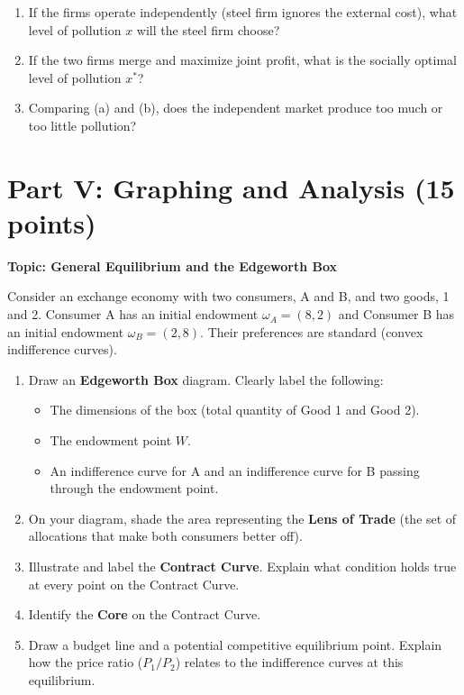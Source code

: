 \documentclass[12pt]{article}
\begin{document}
\begin{enumerate}
    \item[(a)] If the firms operate independently (steel firm ignores the external cost), what level of pollution $x$ will the steel firm choose?
    \item[(b)] If the two firms merge and maximize joint profit, what is the socially optimal level of pollution $x^*$?
    \item[(c)] Comparing (a) and (b), does the independent market produce too much or too little pollution?
\end{enumerate}

\section*{Part V: Graphing and Analysis (15 points)}

\textbf{Topic: General Equilibrium and the Edgeworth Box}

Consider an exchange economy with two consumers, A and B, and two goods, 1 and 2.
Consumer A has an initial endowment $\omega_A = (8, 2)$ and Consumer B has an initial endowment $\omega_B = (2, 8)$.
Their preferences are standard (convex indifference curves).

\begin{enumerate}
    \item[(a)] Draw an \textbf{Edgeworth Box} diagram. Clearly label the following:
    \begin{itemize}
        \item The dimensions of the box (total quantity of Good 1 and Good 2).
        \item The endowment point $W$.
        \item An indifference curve for A and an indifference curve for B passing through the endowment point.
    \end{itemize}
    \item[(b)] On your diagram, shade the area representing the \textbf{Lens of Trade} (the set of allocations that make both consumers better off).
    \item[(c)] Illustrate and label the \textbf{Contract Curve}. Explain what condition holds true at every point on the Contract Curve.
    \item[(d)] Identify the \textbf{Core} on the Contract Curve.
    \item[(e)] Draw a budget line and a potential competitive equilibrium point. Explain how the price ratio ($P_1/P_2$) relates to the indifference curves at this equilibrium.
\end{enumerate}
\end{document}
